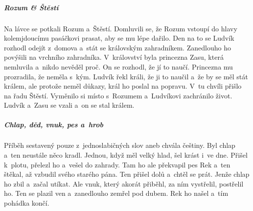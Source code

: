 {{\subparagraph{Rozum \& Štěstí}
	Na lávce se potkali Rozum a~Štěstí. Domluvili se, že Rozum vstoupí do hlavy
	kolemjdoucímu pasáčkovi prasat, aby se mu lépe dařilo. Den na to se Ludvík
	rozhodl odejít z~domova a~stát se královským zahradníkem. Zanedlouho ho
	povýšili na vrchního zahradníka. V~království byla princezna Zasu, která
	nemluvila a~nikdo nevěděl proč. On se rozhodl, že jí to naučí. Princezna mu
	prozradila, že neměla s~kým. Ludvík řekl králi, že ji to naučil a~že by se měl
	stát králem, ale protože neměl důkazy, král ho poslal na popravu. V~tu chvíli
	přišlo na řadu Štěstí. Vyměnilo si místo s~Rozumem a~Ludvíkovi zachránilo
	život. Ludvík a~Zasu se vzali a~on se stal králem.

\subparagraph{Chlap, děd, vnuk, pes a~hrob}
	Příběh sestavený pouze z~jednoslabičných slov aneb chvála češtiny. Byl
	chlap a~ten neustále něco kradl. Jednou, když měl velký hlad, šel krást
i~ve dne. Přišel k~plotu, přelezl ho a~vešel do zahrady. Tam ho ale překvapil
	pes Rek a~ten štěkal, až vzbudil svého starého pána. Ten přišel dolů
a~chtěl se prát. Jenže chlap ho zbil a~začal utíkat. Ale vnuk, který akorát
	přiběhl, za ním vystřelil, postřelil ho. Ten se plazil ven a~zanedlouho
	zemřel pod dubem. Rek ho našel a~tím pohádka končí.
}


\newpart


\newpart




}
